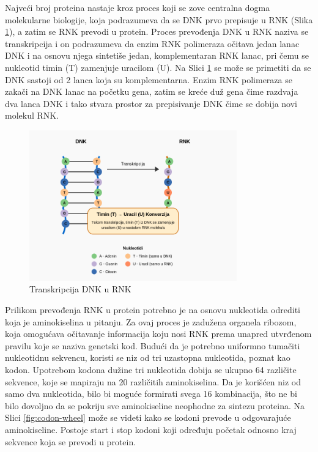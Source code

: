 \documentclass[12pt,oneside]{memoir}
\begin{document}
Najveći broj proteina nastaje kroz proces koji se zove centralna dogma molekularne biologije, koja podrazumeva da se DNK prvo prepisuje u RNK (Slika \ref{fig:transkripcija}), a zatim se RNK prevodi u protein. Proces prevođenja DNK u RNK naziva se transkripcija i on podrazumeva da enzim RNK polimeraza očitava jedan lanac DNK i na osnovu njega sintetiše jedan, komplementaran RNK lanac, pri čemu se nukleotid timin (T) zamenjuje uracilom (U). Na Slici \ref{fig:transkripcija} se može se primetiti da se DNK sastoji od 2 lanca koja su komplementarna. Enzim RNK polimeraza se zakači na DNK lanac na početku gena, zatim se kreće duž gena čime razdvaja dva lanca DNK i tako stvara prostor za prepisivanje DNK čime se dobija novi molekul RNK.

\begin{figure}[h]
  \centering
  \includegraphics[width=0.8\textwidth]{images/dna_rna_transcription_diagram.png}
  \caption{Transkripcija DNK u RNK}
  \label{fig:transkripcija}
\end{figure}

Prilikom prevođenja RNK u protein potrebno je na osnovu nukleotida odrediti koja je aminokiselina u pitanju. Za ovaj proces je zadužena organela ribozom, koja omogućava očitavanje informacija koju nosi RNK prema unapred utvrđenom pravilu koje se naziva genetski kod. Budući da je potrebno uniformno tumačiti nukleotidnu sekvencu, koristi se niz od tri uzastopna nukleotida, poznat kao kodon. Upotrebom kodona dužine tri nukleotida dobija se ukupno 64 različite sekvence, koje se mapiraju na 20 različitih aminokiselina. Da je korišćen niz od samo dva nukleotida, bilo bi moguće formirati svega 16 kombinacija, što ne bi bilo dovoljno da se pokriju sve aminokiseline neophodne za sintezu proteina. Na Slici \ref{fig:codon-wheel} može se videti kako se kodoni prevode u odgovarajuće aminokiseline. Postoje start i stop kodoni koji određuju početak odnosno kraj sekvence koja se prevodi u protein.
\end{document}
